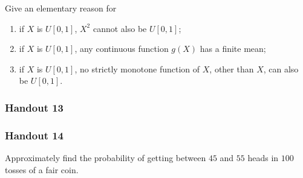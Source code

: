 \begin{problem}[Handout 12, \# 14]
  Give an elementary reason for
  \begin{enumerate}[label=(\alph*),noitemsep]
  \item if \(X\) is \(U[0,1]\), \(X^2\) cannot also be \(U[0,1]\);
  \item if \(X\) is \(U[0,1]\), any continuous function \(g(X)\) has a
    finite mean;
  \item if \(X\) is \(U[0,1]\), no strictly monotone function of \(X\),
    other than \(X\), can also be \(U[0,1]\).
  \end{enumerate}
\end{problem}
\begin{solution*}
\end{solution*}

\subsubsection{Handout 13}
\begin{problem}
\end{problem}
\begin{solution*}
\end{solution*}

\begin{problem}
\end{problem}
\begin{solution*}
\end{solution*}

\begin{problem}
\end{problem}
\begin{solution*}
\end{solution*}

\subsubsection{Handout 14}
\begin{problem}[Handout 14, \# 2]
  Approximately find the probability of getting between \(45\) and \(55\)
  heads in \(100\) tosses of a fair coin.
\end{problem}
\begin{solution*}
\end{solution*}

